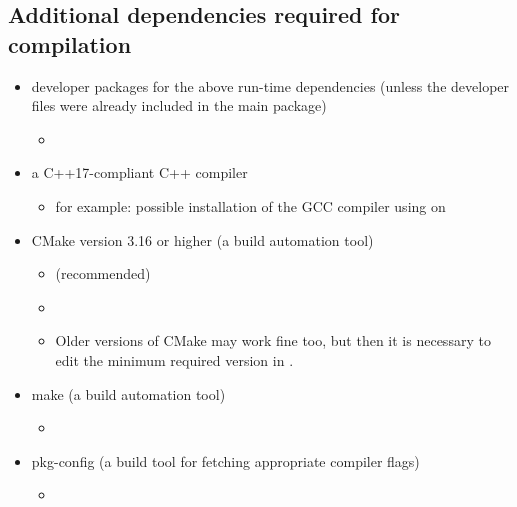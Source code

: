 \documentclass[11pt,a4paper,twoside,openright]{report}
\begin{document}
\subsection{Additional dependencies required for compilation}\label{sec:compiledeps}
\begin{itemize}
	\item developer packages for the above run-time dependencies (unless the developer files were already included in the main package)
		\begin{itemize}
			\item \pubinst
				\vspace*{5pt}

				\\
				\vspace*{5pt}
		\end{itemize}
	\item a C++17-compliant C++ compiler
		\begin{itemize}
			\item for example: possible installation of the GCC compiler using  on 
		\end{itemize}
	\item CMake version 3.16 or higher (a build automation tool)
		\begin{itemize}
			\item \psubinst{} (recommended)
			\item \pubinst
			\item Older versions of CMake may work fine too, but then it is necessary to edit the minimum required version in .
		\end{itemize}
	\item make (a build automation tool)
		\begin{itemize}
			\item \pubinst
		\end{itemize}
	\item pkg-config (a build tool for fetching appropriate compiler flags)
		\begin{itemize}
			\item \pubinst
		\end{itemize}
\end{itemize}
\end{document}
